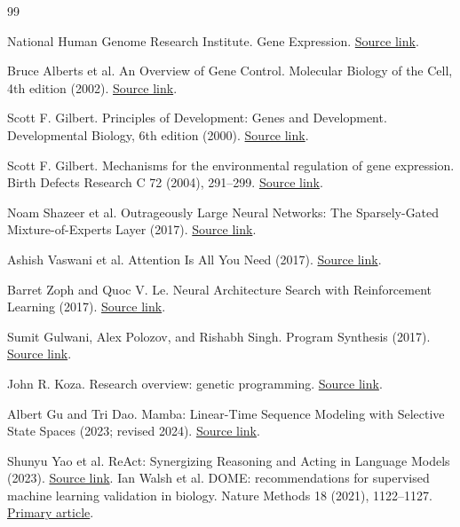 \begin{thebibliography}{99}
 National Human Genome Research Institute. Gene Expression. \href{https://www.genome.gov/genetics-glossary/Gene-Expression}{Source link}.

 Bruce Alberts et al. An Overview of Gene Control. Molecular Biology of the Cell, 4th edition (2002). \href{https://www.ncbi.nlm.nih.gov/books/NBK26885/}{Source link}.

 Scott F. Gilbert. Principles of Development: Genes and Development. Developmental Biology, 6th edition (2000). \href{https://www.ncbi.nlm.nih.gov/books/NBK10050/}{Source link}.

 Scott F. Gilbert. Mechanisms for the environmental regulation of gene expression. Birth Defects Research C 72 (2004), 291--299. \href{https://pubmed.ncbi.nlm.nih.gov/15662704/}{Source link}.

 Noam Shazeer et al. Outrageously Large Neural Networks: The Sparsely-Gated Mixture-of-Experts Layer (2017). \href{https://arxiv.org/abs/1701.06538}{Source link}.

 Ashish Vaswani et al. Attention Is All You Need (2017). \href{https://arxiv.org/abs/1706.03762}{Source link}.

 Barret Zoph and Quoc V. Le. Neural Architecture Search with Reinforcement Learning (2017). \href{https://arxiv.org/abs/1611.01578}{Source link}.

 Sumit Gulwani, Alex Polozov, and Rishabh Singh. Program Synthesis (2017). \href{https://www.microsoft.com/en-us/research/publication/program-synthesis/}{Source link}.

 John R. Koza. Research overview: genetic programming. \href{https://www.genetic-programming.com/johnkoza.html}{Source link}.

 Albert Gu and Tri Dao. Mamba: Linear-Time Sequence Modeling with Selective State Spaces (2023; revised 2024). \href{https://arxiv.org/abs/2312.00752}{Source link}.

 Shunyu Yao et al. ReAct: Synergizing Reasoning and Acting in Language Models (2023). \href{https://arxiv.org/abs/2210.03629}{Source link}.
 Ian Walsh et al. DOME: recommendations for supervised machine learning validation in biology. Nature Methods 18 (2021), 1122--1127. \href{https://doi.org/10.1038/s41592-021-01205-4}{Primary article}.


\end{thebibliography}
